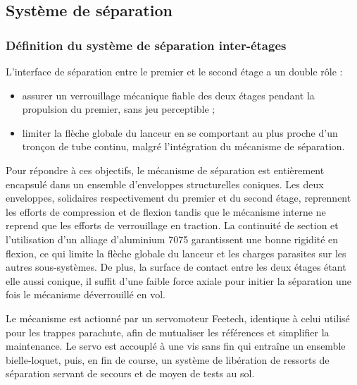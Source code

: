 \subsection{Système de séparation}
\label{subsec:sys_sepa}

\subsubsection{Définition du système de séparation inter-étages}


L'interface de séparation entre le premier et le second étage a un double rôle :
\begin{itemize}
    \item assurer un verrouillage mécanique fiable des deux étages pendant la propulsion du premier, sans jeu perceptible ;
    \item limiter la flèche globale du lanceur en se comportant au plus proche d'un tronçon de tube continu, malgré
    l'intégration du mécanisme de séparation.\\
\end{itemize}

Pour répondre à ces objectifs, le mécanisme de séparation est entièrement encapsulé dans un ensemble d'enveloppes structurelles
coniques. Les deux enveloppes, solidaires respectivement du premier et du second étage, reprennent les efforts de compression et
de flexion tandis que le mécanisme interne ne reprend que les efforts de verrouillage en traction. La continuité de section et
l'utilisation d'un alliage d'aluminium 7075 garantissent une bonne rigidité en flexion, ce qui limite la flèche globale du
lanceur et les charges parasites sur les autres sous-systèmes. De plus, la surface de contact entre les deux étages étant elle
aussi conique, il suffit d'une faible force axiale pour initier la séparation une fois le mécanisme déverrouillé en vol.


Le mécanisme est actionné par un servomoteur Feetech, identique à celui utilisé pour les trappes parachute, afin de mutualiser les
références et simplifier la maintenance. Le servo est accouplé à une vis sans fin qui entraîne un ensemble bielle-loquet, puis,
en fin de course, un système de libération de ressorts de séparation servant de secours et de moyen de tests au sol.\\

